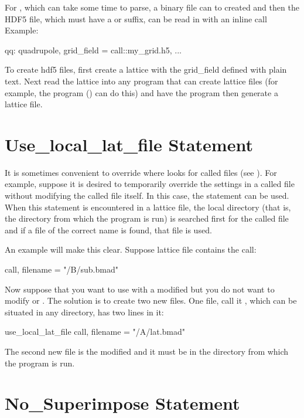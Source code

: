{{{{{For , which can take some time to parse, a  binary file can to created and then
the HDF5 file, which must have a  or  suffix, can be read in with an inline call Example:
\begin{example}
  qq: quadrupole, grid_field = call::my_grid.h5, ...
\end{example}
To create hdf5 files, first create a lattice with the grid_field defined with plain text. Next read
the lattice into any program that can create \bmad lattice files (for example, the \tao program
() can do this) and have the program then generate a lattice file.

\section{Use_local_lat_file Statement}
\label{s:use.loc}

It is sometimes convenient to override where \bmad looks for called files (see ). For
example, suppose it is desired to temporarily override the settings in a called file without
modifying the called file itself. In this case, the  statement can be
used. When this statement is encountered in a lattice file, the local directory (that is, the
directory from which the program is run) is searched first for the called file and if a file of the
correct name is found, that file is used.

An example will make this clear. Suppose lattice file 
contains the call:
\begin{example}
  call, filename = "/B/sub.bmad"
\end{example}
Now suppose that you want to use  with a modified  but you do not want to
modify  or . The solution is to create two new files. One file, call
it , which can be situated in any directory, has two lines in it:
\begin{example}
  use_local_lat_file
  call, filename = "/A/lat.bmad"
\end{example}
The second new file is the modified  and it must be in the directory from which the
program is run.

\section{No_Superimpose Statement}
\label{s:no.sup}

}}}}}
